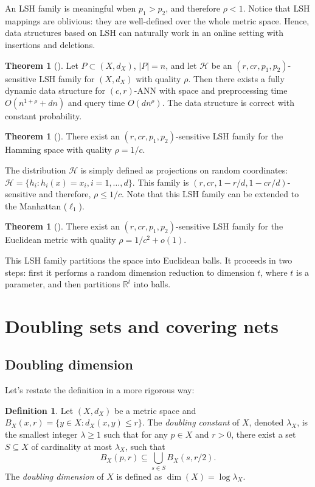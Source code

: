 \documentclass[10pt,a4paper,twoside]{book}
\theoremstyle{definition}
\newtheorem*{definition*}{Definition}
\newtheorem{theorem}[definition]{Theorem}
\theoremstyle{remark}
\begin{document}
An LSH family is meaningful when $p_1 > p_2$, and therefore $\rho < 1$. Notice that LSH mappings are oblivious: they are well-defined over the whole metric space. Hence, data structures based on LSH can naturally work in an online setting with insertions and deletions.

\begin{theorem} [\cite{IM98}]
Let $P \subset (X, d_X)$, $|P|=n$, and let $\mathcal{H}$ be an $(r,cr,p_1,p_2)$-sensitive LSH family for $(X, d_X)$ with quality $\rho$. Then there exists a fully dynamic data structure for $(c,r)$-ANN with space and preprocessing time $O(n^{1+\rho} + dn)$ and query time $O(dn^{\rho})$. The data structure is correct with constant probability.
\end{theorem}

\begin{theorem} [\cite{IM98}]
There exist an $(r,cr,p_1,p_2)$-sensitive LSH family for the Hamming space with quality $\rho = 1/c$.
\end{theorem}
The distribution $\mathcal{H}$ is simply defined as projections on random coordinates: $\mathcal{H} = \{h_i: h_i(x)=x_i, i =1, \ldots,d \}$. This family is $(r,cr,1-r/d,1-cr/d)$-sensitive and therefore, $\rho \leq 1/c$. Note that this LSH family can be extended to the Manhattan ($\ell_1$). 

\begin{theorem} [\cite{AI08}] \label{theorem:lsh2}
There exist an $(r,cr,p_1,p_2)$-sensitive LSH family for the Euclidean metric with quality $\rho = 1/c^2 + o(1)$.
\end{theorem}
This LSH family partitions the space into Euclidean balls. It proceeds in two steps: first it performs a random dimension reduction to dimension $t$, where $t$ is a parameter, and then partitions $\mathbb{R}^t$ into balls.

\section{Doubling sets and covering nets} \label{section:double}
\subsection*{Doubling dimension}
Let's restate the definition in a more rigorous way:
\begin{definition*} 
Let $(X, d_X)$ be a metric space and $B_X(x,r)=\{y \in X: d_X(x,y) \leq r \}$. The {\em doubling constant} of $X$, denoted $\lambda_X$, is the smallest integer $\lambda \geq 1$ such that for any $p \in X$ and $r > 0$, there exist a set $S \subseteq X$ of cardinality at most $\lambda_X$, such that
\[
B_X(p,r) \subseteq \bigcup_{s \in S} B_X(s,r/2).
\]
The \textit{doubling dimension} of $X$ is defined as $\dim(X)=\log{\lambda_X}$.
\end{definition*}
\end{document}
